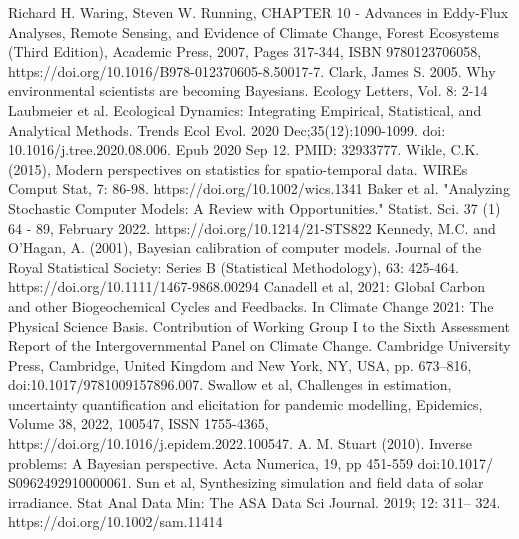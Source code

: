 \documentclass[12pt]{article}
\begin{document}
\begin{thebibliography}{20}
 Richard H. Waring, Steven W. Running, CHAPTER 10 - Advances in Eddy-Flux Analyses, Remote Sensing, and Evidence of Climate Change, Forest Ecosystems (Third Edition), Academic Press, 2007, Pages 317-344, ISBN 9780123706058, https://doi.org/10.1016/B978-012370605-8.50017-7.
 Clark, James S. 2005. Why environmental scientists are becoming Bayesians. Ecology Letters, Vol. 8: 2-14
 Laubmeier et al. Ecological Dynamics: Integrating Empirical, Statistical, and Analytical Methods. Trends Ecol Evol. 2020 Dec;35(12):1090-1099. doi: 10.1016/j.tree.2020.08.006. Epub 2020 Sep 12. PMID: 32933777.
 Wikle, C.K. (2015), Modern perspectives on statistics for spatio-temporal data. WIREs Comput Stat, 7: 86-98. https://doi.org/10.1002/wics.1341
 Baker et al. "Analyzing Stochastic Computer Models: A Review with Opportunities." Statist. Sci. 37 (1) 64 - 89, February 2022. https://doi.org/10.1214/21-STS822
 Kennedy, M.C. and O'Hagan, A. (2001), Bayesian calibration of computer models. Journal of the Royal Statistical Society: Series B (Statistical Methodology), 63: 425-464. https://doi.org/10.1111/1467-9868.00294
 Canadell et al, 2021: Global Carbon and
other Biogeochemical Cycles and Feedbacks. In Climate Change 2021: The Physical Science Basis. Contribution of
Working Group I to the Sixth Assessment Report of the Intergovernmental Panel on Climate Change. Cambridge University Press,
Cambridge, United Kingdom and New York, NY, USA, pp. 673–816, doi:10.1017/9781009157896.007.
 Swallow et al, Challenges in estimation, uncertainty quantification and elicitation for pandemic modelling, Epidemics, Volume 38, 2022, 100547, ISSN 1755-4365, https://doi.org/10.1016/j.epidem.2022.100547.
 A. M. Stuart (2010). Inverse problems: A Bayesian perspective. Acta Numerica, 19, pp 451-559 doi:10.1017/
S0962492910000061.
 Sun et al, Synthesizing simulation and field data of solar irradiance. Stat Anal Data Min: The ASA Data Sci Journal. 2019; 12: 311– 324. https://doi.org/10.1002/sam.11414
\end{thebibliography}
\end{document}
